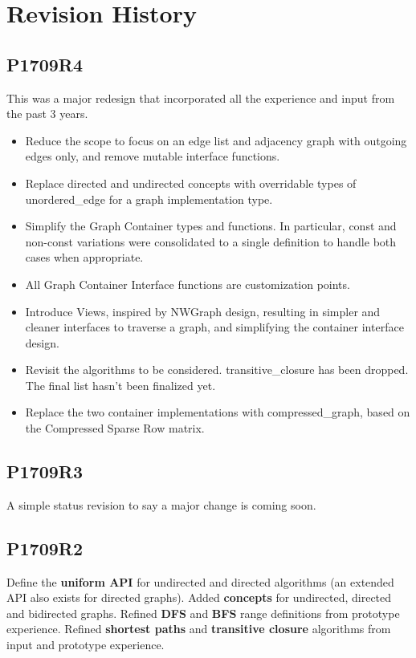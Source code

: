 \chapter*{Revision History}
\section*{P1709R4}
This was a major redesign that incorporated all the experience and input from the past 3 years.
\begin{itemize}
\item Reduce the scope to focus on an edge list and adjacency graph with outgoing edges only, and remove mutable interface functions. 
\item Replace directed and undirected concepts with overridable types of unordered\_edge for a graph implementation type.
\item Simplify the Graph Container types and functions. In particular, const and non-const variations were consolidated to a single definition to handle both cases 
when appropriate.
\item All Graph Container Interface functions are customization points.
\item Introduce Views, inspired by NWGraph design, resulting in simpler and cleaner interfaces to traverse a graph, and simplifying the container interface design.
\item Revisit the algorithms to be considered. transitive\_closure has been dropped. The final list hasn't been finalized yet.
\item Replace the two container implementations with compressed\_graph, based on the Compressed Sparse Row matrix.
\end{itemize}

\section*{P1709R3}
A simple status revision to say a major change is coming soon.

\section*{P1709R2}
Define the \textbf{uniform API} for undirected and directed algorithms (an extended API also exists for directed graphs). Added \textbf{concepts} for undirected, directed and bidirected graphs. Refined \textbf{DFS} and \textbf{BFS} range definitions from prototype experience. Refined \textbf{shortest paths} and \textbf{transitive closure} algorithms from input and prototype experience.

